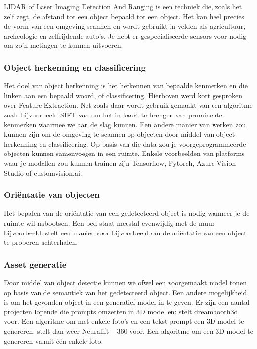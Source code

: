 \documentclass{hogent-article}
\begin{document}
LIDAR of Laser Imaging Detection And Ranging is een techniek die, zoals het zelf zegt, de afstand tot een object bepaald tot een object. Het kan heel precies de vorm van een omgeving scannen en wordt gebruikt in velden als agricultuur, archeologie en zelfrijdende auto’s. Je hebt er gespecialiseerde sensors voor nodig om zo’n metingen te kunnen uitvoeren.

\subsubsection{Object herkenning en classificering}

Het doel van object herkenning is het herkennen van bepaalde kenmerken en die linken aan een bepaald woord, of classificering. Hierboven werd kort gesproken over Feature Extraction. Net zoals daar wordt gebruik gemaakt van een algoritme zoals bijvoorbeeld SIFT van \textcite{Schonberger2016} om het in kaart te brengen van prominente kenmerken waarmee we aan de slag kunnen. 
Een andere manier van werken zou kunnen zijn om de omgeving te scannen op objecten door middel van object herkenning en classificering. Op basis van die data zou je voorgeprogrammeerde objecten kunnen samenvoegen in een ruimte. 
Enkele voorbeelden van platforms waar je modellen zou kunnen trainen zijn Tensorflow, Pytorch, Azure Vision Studio of customvision.ai. 

\subsubsection{Oriëntatie van objecten}

Het bepalen van de oriëntatie van een gedetecteerd object is nodig wanneer je de ruimte wil nabootsen. Een bed staat meestal evenwijdig met de muur bijvoorbeeld. \textcite{Saxena2009} stelt een manier voor bijvoorbeeld om de oriëntatie van een object te proberen achterhalen.

\subsubsection{Asset generatie}

Door middel van object detectie kunnen we ofwel een voorgemaakt model tonen op basis van de semantiek van het gedetecteerd object. Een andere mogelijkheid is om het gevonden object in een generatief model in te geven. Er zijn een aantal projecten lopende die prompts omzetten in 3D modellen: 
\textcite{Raj2023} stelt dreambooth3d voor. Een algoritme om met enkele foto’s en een tekst-prompt  een 3D-model te genereren.
\textcite{Xu2023} stelt dan weer Neuralift – 360 voor.  Een algoritme om een 3D model te genereren vanuit één enkele foto.
\end{document}
